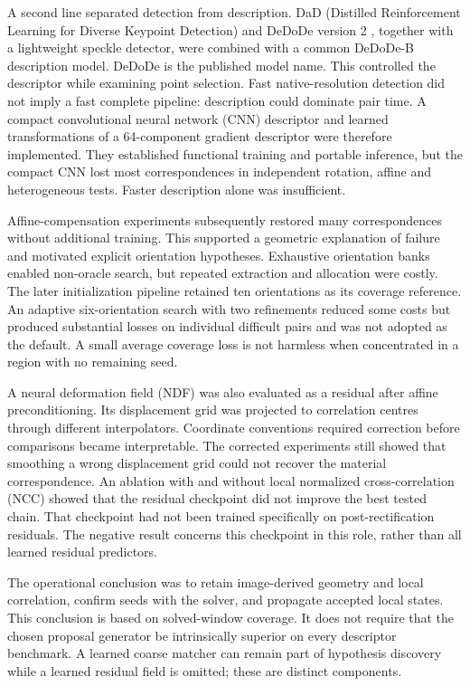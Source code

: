 \documentclass[11pt,a4paper]{article}
\begin{document}
A second line separated detection from description. DaD (Distilled Reinforcement Learning for Diverse Keypoint Detection) and DeDoDe version 2 \citep{dad,dedode}, together with a lightweight speckle detector, were combined with a common DeDoDe-B description model. DeDoDe is the published model name. This controlled the descriptor while examining point selection. Fast native-resolution detection did not imply a fast complete pipeline: description could dominate pair time. A compact convolutional neural network (CNN) descriptor and learned transformations of a 64-component gradient descriptor were therefore implemented. They established functional training and portable inference, but the compact CNN lost most correspondences in independent rotation, affine and heterogeneous tests. Faster description alone was insufficient.

Affine-compensation experiments subsequently restored many correspondences without additional training. This supported a geometric explanation of failure and motivated explicit orientation hypotheses. Exhaustive orientation banks enabled non-oracle search, but repeated extraction and allocation were costly. The later initialization pipeline retained ten orientations as its coverage reference. An adaptive six-orientation search with two refinements reduced some costs but produced substantial losses on individual difficult pairs and was not adopted as the default. A small average coverage loss is not harmless when concentrated in a region with no remaining seed.

A neural deformation field (NDF) was also evaluated as a residual after affine preconditioning. Its displacement grid was projected to correlation centres through different interpolators. Coordinate conventions required correction before comparisons became interpretable. The corrected experiments still showed that smoothing a wrong displacement grid could not recover the material correspondence. An ablation with and without local normalized cross-correlation (NCC) showed that the residual checkpoint did not improve the best tested chain. That checkpoint had not been trained specifically on post-rectification residuals. The negative result concerns this checkpoint in this role, rather than all learned residual predictors.

The operational conclusion was to retain image-derived geometry and local correlation, confirm seeds with the solver, and propagate accepted local states. This conclusion is based on solved-window coverage. It does not require that the chosen proposal generator be intrinsically superior on every descriptor benchmark. A learned coarse matcher can remain part of hypothesis discovery while a learned residual field is omitted; these are distinct components.
\end{document}
